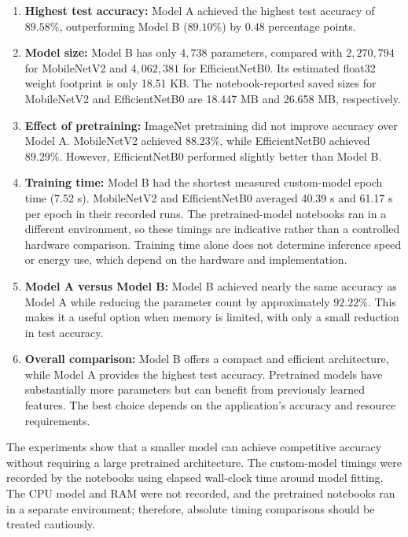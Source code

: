 \documentclass[12pt,a4paper]{article}
\begin{document}
\begin{enumerate}[leftmargin=1.5em]

    \item \textbf{Highest test accuracy:}
    Model A achieved the highest test accuracy of $89.58\%$,
    outperforming Model B ($89.10\%$) by $0.48$ percentage points.

    \item \textbf{Model size:}
    Model B has only $4{,}738$ parameters, compared with
    $2{,}270{,}794$ for MobileNetV2 and $4{,}062{,}381$ for
    EfficientNetB0. Its estimated float32 weight footprint is only
    18.51 KB. The notebook-reported saved sizes for MobileNetV2 and
    EfficientNetB0 are 18.447 MB and 26.658 MB, respectively.

    \item \textbf{Effect of pretraining:}
    ImageNet pretraining did not improve accuracy over Model A.
    MobileNetV2 achieved $88.23\%$, while EfficientNetB0 achieved
    $89.29\%$. However, EfficientNetB0 performed slightly better
    than Model B.

    \item \textbf{Training time:}
    Model B had the shortest measured custom-model epoch time
    (7.52 s). MobileNetV2 and EfficientNetB0 averaged 40.39 s and
    61.17 s per epoch in their recorded runs. The pretrained-model
    notebooks ran in a different environment, so these timings are
    indicative rather than a controlled hardware comparison.
    Training time alone does not determine inference speed or energy
    use, which depend on the hardware and implementation.

    \item \textbf{Model A versus Model B:}
    Model B achieved nearly the same accuracy as Model A while
    reducing the parameter count by approximately $92.22\%$.
    This makes it a useful option when memory is limited, with
    only a small reduction in test accuracy.

    \item \textbf{Overall comparison:}
    Model B offers a compact and efficient architecture, while
    Model A provides the highest test accuracy. Pretrained models
    have substantially more parameters but can benefit from
    previously learned features. The best choice depends on the
    application's accuracy and resource requirements.

\end{enumerate}

The experiments show that a smaller model can achieve competitive accuracy without requiring a large pretrained architecture. The custom-model timings were recorded by the notebooks using elapsed wall-clock time around model fitting. The CPU model and RAM were not recorded, and the pretrained notebooks ran in a separate environment; therefore, absolute timing comparisons should be treated cautiously.
\end{document}
